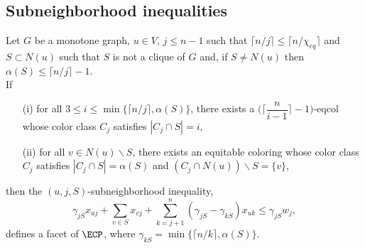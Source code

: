 \subsection{Subneighborhood inequalities}

\begin{tthm} \label{TNEIGHBOR1}
Let $G$ be a monotone graph, $u \in V$, $j \leq n - 1$ such that $\lceil n/j \rceil \leq \lceil n/\chi_{eq} \rceil$
and $S \subset N(u)$ such that $S$ is not a clique of $G$ and, if $S \neq N(u)$ then $\alpha(S) \leq \lceil n/j \rceil - 1$.\\
If
\begin{enumerate}
\item[(i)] for all $3 \leq i \leq \min \{\lceil n/j \rceil, \alpha(S)\}$, there exists a
$\biggl(\biggl\lceil \dfrac{n}{i-1} \biggr\rceil - 1\biggl)$-eqcol whose color class $C_j$ satisfies $|C_j\cap S| = i$,
\item[(ii)] for all $v \in N(u) \backslash S$, there exists an equitable coloring whose color class $C_j$ satisfies
$|C_j \cap S| = \alpha(S)$ and $(C_j\cap N(u)) \backslash S=\{v\}$,
\end{enumerate}
then the $(u,j,S)$-subneighborhood inequality, \ie
\begin{equation} \label{RNEIGHBOR1AGAIN}
\gamma_{jS} x_{uj} + \sum_{v \in S} x_{vj} +
\sum_{k = j+1}^n (\gamma_{jS} - \gamma_{kS}) x_{uk} \leq \gamma_{jS} w_j,
\end{equation}
defines a facet of $\ECP$, where
$\gamma_{kS} = \min \{\lceil n/k \rceil, \alpha(S)\}$.
\end{tthm}

